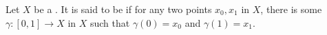 \begin{definition} \label{definition:path_connected_topological_space}
    Let $X$ be a .  
    It is said to be  if for any two points $x_0, x_1$ in $X$, there is some  $\gamma: [0,1] \to X$ in $X$ such that $\gamma(0) = x_0$ and $\gamma(1) = x_1$. 
\end{definition}
